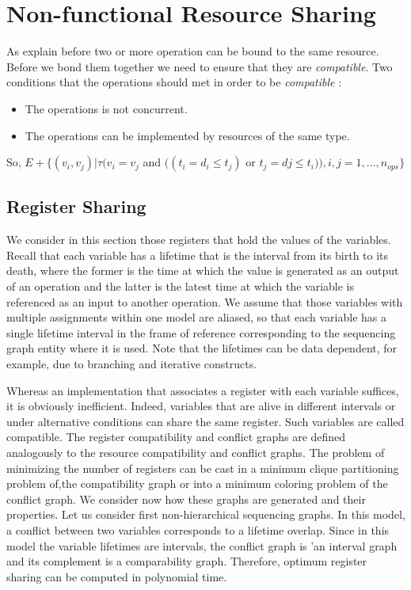\section{Non-functional Resource Sharing}


As explain before two or more operation can be bound to the same resource. Before we bond them together we need to ensure that they are \textit{compatible}. Two conditions that the operations should met in order to be \textit{compatible} :

\begin{itemize}
\item The operations is not concurrent.
\item The operations can be implemented by resources of the same type.
\end{itemize}

So, $ E+\{(v_{i},v_{j})|\tau(v_{i}=v_{j} $ and $ ((t_{i}=d_{i} \leq t_{j}) $ or $ t_{j}=d{j} \leq t_{i})),i,j=1,...,n_{ops}\}$ %


\subsection{Register Sharing}

We consider in this section those registers that hold the values of the variables. Recall that each variable has a lifetime that is the interval from its birth to its death, where 
the former is the time at which the value is generated as an output of an operation and the latter is the latest time at which the variable is referenced as an input to another operation. We assume that those variables with multiple assignments within one model are aliased, so that each variable has a single lifetime interval in the frame of reference corresponding to the sequencing graph entity where it is used. Note that the lifetimes can be data dependent, for example, due to branching and iterative constructs.

Whereas an implementation that associates a register with each variable suffices, it is obviously inefficient. Indeed, variables that are alive in different intervals or under alternative conditions can share the same register. Such variables are called compatible. The register compatibility and conflict graphs are defined analogously to the resource compatibility and conflict graphs. The problem of minimizing the number of registers can be cast in a minimum clique partitioning problem of,the compatibility graph or into a minimum coloring problem of the conflict graph. We consider now how these graphs are generated and their properties. Let us consider first non-hierarchical sequencing graphs. In this model, a conflict between two variables corresponds to a lifetime overlap. Since in this model the variable lifetimes are intervals, the conflict graph is 'an interval graph and its complement is a comparability graph. Therefore, optimum register sharing can be computed in polynomial time.

